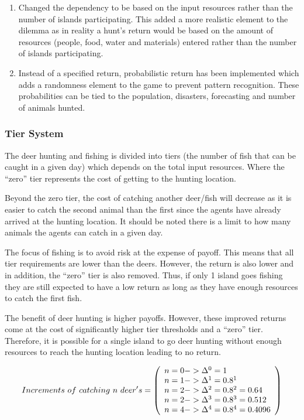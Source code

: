 \begin{enumerate}
    \item Changed the dependency to be based on the input resources rather than the number of islands participating. This added a more realistic element to the dilemma as in reality a hunt’s return would be based on the amount of resources (people, food, water and materials) entered rather than the number of islands participating.
    \item Instead of a specified return, probabilistic return has been implemented which adds a randomness element to the game to prevent pattern recognition. These probabilities can be tied to the population, disasters, forecasting and number of animals hunted.  
\end{enumerate}

\subsubsection{Tier System}

The deer hunting and fishing is divided into tiers (the number of fish that can be caught in a given day) which depends on the total input resources. Where the “zero” tier represents the cost of getting to the hunting location.

Beyond the zero tier, the cost of catching another deer/fish will decrease as it is easier to catch the second animal than the first since the agents have already arrived at the hunting location. It should be noted there is a limit to how many animals the agents can catch in a given day.

The focus of fishing is to avoid risk at the expense of payoff. This means that all tier requirements are lower than the deers. However, the return is also lower and in addition, the “zero” tier is also removed. Thus, if only 1 island goes fishing they are still expected to have a low return as long as they have enough resources to catch the first fish.

The benefit of deer hunting is higher payoffs. However, these improved returns come at the cost of significantly higher tier thresholds and a “zero” tier. Therefore, it is possible for a single island to go deer hunting without enough resources to reach the hunting location leading to no return.

\begin{equation}
Increments\ of\ catching\ n\ deer's=
\left( \begin{array}{ll@{}}
n=0 -> \Delta^0 = 1 \\
n=1 -> \Delta^1 = 0.8^1 \\
n=2 -> \Delta^2 = 0.8^2 = 0.64 \\
n=2 -> \Delta^3 = 0.8^3 = 0.512 \\
n=4 -> \Delta^4 = 0.8^4 = 0.4096\\
\end{array} \right) 
\label{eq:Cumulative Cost 1}
\end{equation}

